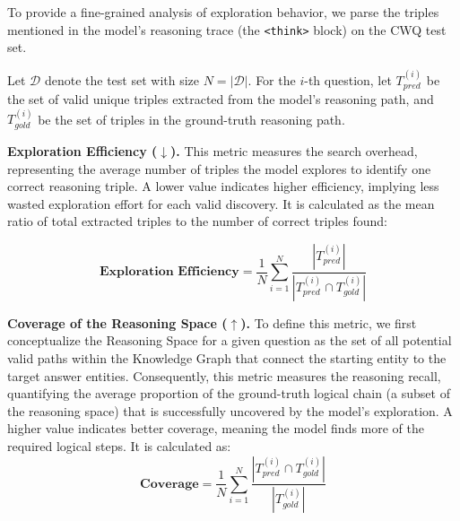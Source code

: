 To provide a fine-grained analysis of exploration behavior, we parse the 
triples mentioned in the model's reasoning trace (the \texttt{<think>} block) 
on the CWQ test set.

Let $\mathcal{D}$ denote the test set with size $N = |\mathcal{D}|$. 
For the $i$-th question, let $T_{pred}^{(i)}$ be the set of valid unique 
triples extracted from the model's reasoning path, and 
$T_{gold}^{(i)}$ be the set of triples in the ground-truth reasoning path.

\textbf{Exploration Efficiency ($\downarrow$).}
This metric measures the search overhead, representing the average number of triples the model explores to identify one correct reasoning triple. 
A lower value indicates higher efficiency, implying less wasted exploration effort for each valid discovery.
It is calculated as the mean ratio of total extracted triples to the number of correct triples found:

\begin{equation}
    \textbf{Exploration Efficiency} = \frac{1}{N} \sum_{i=1}^{N} 
    \frac{|T_{pred}^{(i)}|}
    {|T_{pred}^{(i)} \cap T_{gold}^{(i)}|}
\end{equation}

\textbf{Coverage of the Reasoning Space ($\uparrow$).}
To define this metric, we first conceptualize the Reasoning Space for a given question as the set of all potential valid paths within the Knowledge Graph that connect the starting entity to the target answer entities. Consequently, this metric measures the reasoning recall, quantifying the average proportion of the ground-truth logical chain (a subset of the reasoning space) that is successfully uncovered by the model's exploration.
A higher value indicates better coverage, meaning the model finds more of the required logical steps.
It is calculated as:
\begin{equation}
    \textbf{Coverage} = \frac{1}{N} \sum_{i=1}^{N} 
    \frac{|T_{pred}^{(i)} \cap T_{gold}^{(i)}|}
    {|T_{gold}^{(i)}|}
\end{equation}
